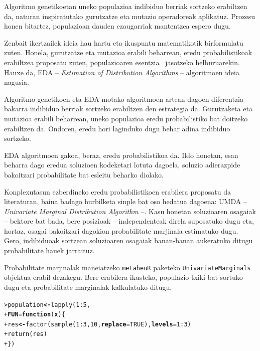 \documentclass[eu]{ifirak}\usepackage[]{graphicx}\usepackage[]{color}
\makeatletter
\newcommand{\hlnum}[1]{\textcolor[rgb]{0.659,0.4,0.051}{#1}}%
\newcommand{\hlopt}[1]{\textcolor[rgb]{0,0,0}{#1}}%
\newcommand{\hlstd}[1]{\textcolor[rgb]{0,0,0}{#1}}%
\newcommand{\hlkwa}[1]{\textcolor[rgb]{0.133,0.224,0.659}{\textbf{#1}}}%
\newcommand{\hlkwb}[1]{\textcolor[rgb]{0.549,0.114,0.412}{\textbf{#1}}}%
\newcommand{\hlkwc}[1]{\textcolor[rgb]{0.659,0.573,0.133}{\textbf{#1}}}%
\newcommand{\hlkwd}[1]{\textcolor[rgb]{0.659,0.133,0.482}{#1}}%
\newenvironment{kframe}{%
 \def\at@end@of@kframe{}%
 \ifinner\ifhmode%
  \def\at@end@of@kframe{\end{minipage}}%
  \begin{minipage}{\columnwidth}%
 \fi\fi%
 \def\FrameCommand##1{\hskip\@totalleftmargin \hskip-\fboxsep
 \colorbox{shadecolor}{##1}\hskip-\fboxsep
     \hskip-\linewidth \hskip-\@totalleftmargin \hskip\columnwidth}%
 \MakeFramed {\advance\hsize-\width
   \@totalleftmargin\z@ \linewidth\hsize
   \@setminipage}}%
 {\par\unskip\endMakeFramed%
 \at@end@of@kframe}
\newenvironment{knitrout}{}{} %
\newcommand{\zkk}{\guillemotleft}
\newcommand{\skk}{\guillemotright}
\newcommand{\code}[1]{\texttt{#1}}
\newcommand{\eng}[1]{\textit{#1}}
\newcommand{\hgl}[1]{\zkk #1\skk\ }
\makeatother
\begin{document}
Algoritmo genetikoetan uneko populazioa indibiduo berriak sortzeko erabiltzen da, naturan inspiratutako gurutzatze eta mutazio operadoreak aplikatuz.  Prozesu honen bitartez, populazioan dauden ezaugarriak mantentzea espero dugu. 

Zenbait ikertzailek ideia hau hartu eta ikuspuntu matematikotik birformulatu zuten. Honela, gurutzatze eta mutazioa erabili beharrean, eredu probabilistikoak erabiltzea proposatu zuten, populazioaren \hgl{esentzia} jasotzeko helburuarekin. Hauxe da, EDA -- \eng{Estimation of Distribution Algorithms} -- algoritmoen ideia nagusia. 

Algoritmo genetikoen eta EDA motako algoritmoen artean dagoen diferentzia bakarra indibiduo berriak sortzeko erabiltzen den estrategia da. Gurutzaketa eta mutazioa erabili beharrean, uneko populazioa eredu probabilistiko bat doitzeko erabiltzen da. Ondoren, eredu hori laginduko dugu behar adina indibiduo sortzeko.

EDA algoritmoen gakoa, beraz, eredu probabilistikoa da. Ildo honetan, esan beharra dago eredua soluzioen kodeketari lotuta dagoela, soluzio adierazpide bakoitzari probabilitate bat esleitu beharko diolako. 

Konplexutasun ezberdineko eredu probabilistikoen erabilera proposatu da literaturan, baina badago hurbilketa sinple bat oso hedatua dagoena: UMDA -- \eng{Univariate Marginal Distribution Algorithm} --. Kasu honetan soluzioaren osagaiak -- bektore bat bada, bere posizioak -- independenteak direla suposatuko dugu eta, hortaz, osagai bakoitzari dagokion probabilitate marjinala estimatuko dugu. Gero, indibiduoak sortzean soluzioaren osagaiak banan-banan aukeratuko ditugu probabilitate hauek jarraituz. 

Probabilitate marjinalak maneiatzeko \code{metaheuR} paketeko \code{UnivariateMarginals} objektua erabil dezakegu. Bere erabilera ikusteko, populazio txiki bat sortuko dugu eta probabilitate marginalak kalkulatuko ditugu. 

\begin{knitrout}
\color{fgcolor}\begin{kframe}
\begin{alltt}
\hlstd{> }\hlstd{population} \hlkwb{<-} \hlkwd{lapply}\hlstd{(}\hlnum{1}\hlopt{:}\hlnum{5}\hlstd{,}
\hlstd{+ }                     \hlkwc{FUN}\hlstd{=}\hlkwa{function}\hlstd{(}\hlkwc{x}\hlstd{) \{}
\hlstd{+ }                       \hlstd{res} \hlkwb{<-} \hlkwd{factor}\hlstd{(}\hlkwd{sample}\hlstd{(}\hlnum{1}\hlopt{:}\hlnum{3}\hlstd{,} \hlnum{10}\hlstd{,} \hlkwc{replace}\hlstd{=}\hlnum{TRUE}\hlstd{),} \hlkwc{levels}\hlstd{=}\hlnum{1}\hlopt{:}\hlnum{3}\hlstd{)}
\hlstd{+ }                       \hlkwd{return}\hlstd{(res)}
\hlstd{+ }                     \hlstd{\})}
\end{alltt}
\end{kframe}
\end{knitrout}
\end{document}
